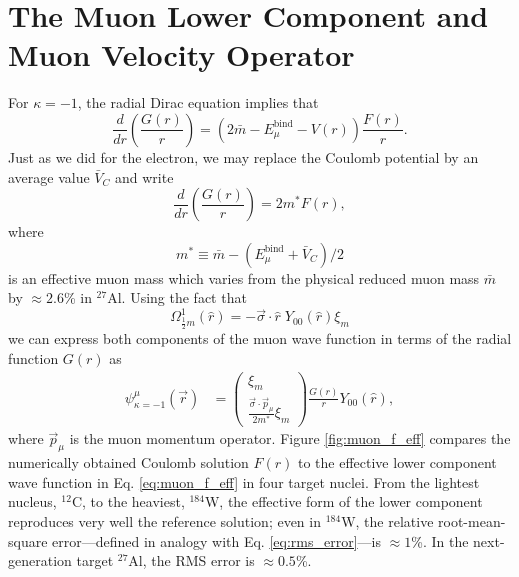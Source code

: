 \documentclass{book}[letterpaper,12pt]
\begin{document}
\section{The Muon Lower Component and Muon Velocity Operator}
\label{sec:muon_lower}
For $\kappa=-1$, the radial Dirac equation implies that
\begin{equation}
\frac{d}{dr}\left(\frac{G(r)}{r}\right)=\left(2\bar{m}-E^\mathrm{bind}_{\mu}-V(r)\right)\frac{F(r)}{r}.
\end{equation}
Just as we did for the electron, we may replace the Coulomb potential by an average value $\bar{V}_C$ and write
\begin{equation}
\frac{d}{dr}\left(\frac{G(r)}{r}\right)=2m^*F(r),
\end{equation}
where
\begin{equation}
m^*\equiv \bar{m}-\left(E^\mathrm{bind}_{\mu}+\bar{V}_C\right)/2
\end{equation}
is an effective muon mass which varies from the physical reduced muon mass $\bar{m}$ by $\approx 2.6$\% in $^{27}$Al. Using the fact that 
\begin{equation}
\Omega^1_{\frac{1}{2}m}(\hat{r})=-\vec{\sigma}\cdot\hat{r}\;Y_{00}(\hat{r})\xi_m
\end{equation}
we can express both components of the muon wave function in terms of the radial function $G(r)$ as
\begin{equation}
\begin{split}
\psi^{\mu}_{\kappa=-1}(\vec{r})&=\left(\begin{array}{c}
\xi_m\\
\frac{\vec{\sigma}\cdot\vec{p}_{\mu}}{2m^*}\xi_m
\end{array}\right)\frac{G(r)}{r}Y_{00}(\hat{r}),
\end{split}
\label{eq:muon_f_eff}
\end{equation}
where $\vec{p}_{\mu}$ is the muon momentum operator. Figure \ref{fig:muon_f_eff} compares the numerically obtained Coulomb solution $F(r)$ to the effective lower component wave function in Eq. \ref{eq:muon_f_eff} in four target nuclei. From the lightest nucleus, $^{12}$C, to the heaviest, $^{184}$W, the effective form of the lower component reproduces very well the reference solution; even in $^{184}$W, the relative root-mean-square error---defined in analogy with Eq. \ref{eq:rms_error}---is $\approx 1$\%. In the next-generation target $^{27}$Al, the RMS error is $\approx 0.5$\%. 
\end{document}
